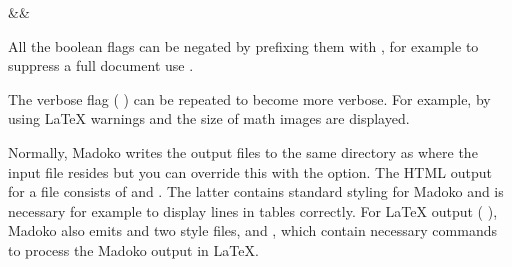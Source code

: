 \documentclass{book}
\begin{document}
\begin{mdTable}
{{} %
{}%
{}%
{}\mdCode[class={code,code1}]{:}%
{}%
{}}&&\\
\midrule[2\cssPixel]
\end{mdTable}
\begin{mdP}[data-line={2990}]%
{}All the boolean flags can be negated by prefixing them with %
{}%
{}, for example
to suppress a full document use %
{}%
{}.%
\end{mdP}%
\begin{mdP}[class={indent},data-line={2993}]%
{}The verbose flag (%
{}%
{}) can be repeated to become more verbose. For example, 
by using %
{}%
{} LaTeX warnings and the size of math images are displayed.%
\end{mdP}%
\begin{mdP}[class={indent},data-line={2996}]%
{}Normally, Madoko writes the output files to the same directory as where the
input file resides but you can override this with the %
{}%
{} option.  The
HTML output for a file %
{}%
{}%
{} consists of %
{}%
{}%
{} and
{}%
{}. The latter contains standard styling for Madoko and is necessary
for example to display lines in tables correctly. For LaTeX output (%
{}%
{}),
Madoko also emits %
{}%
{}%
{} and two style files, %
{}%
{} and
{}%
{}, which contain necessary commands to  process the Madoko output
in LaTeX.%
\end{mdP}%
\end{document}
